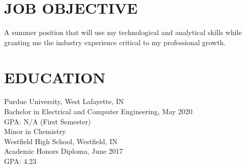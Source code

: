 \documentclass[10pt]{res}
\begin{document}
 
\vspace{-30pt}

\address{\bf  PRESENT ADDRESS\\ 1165 West Stadium Avenue \\ West Lafayette IN 47906-4235 }
\address{\bf PERMANENT ADDRESS \\ 14977 Montclair Drive \\ Westfield, IN, 46074 \\ (317) 363-7700 \\ joseph@gerardot.org/indyjag@gmail.com } 
                                  
\begin{resume}

\section{JOB OBJECTIVE}          
	A summer position that will use my technological and analytical skills while granting me the industry experience critical to my professional growth.
\section{EDUCATION}          
    Purdue University, West Lafayette, IN \\ 
    Bachelor in Electrical and Computer Engineering, May 2020   \\       
	GPA: N/A (First Semester) \\
    Minor in Chemistry\\   
	Westfield High School, Westfield, IN \\
	Academic Honors Diploma, June 2017 \\
	GPA: 4.23 \\
 

\end{resume}
\end{document}
